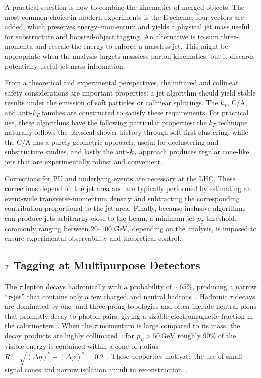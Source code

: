 A practical question is how to combine the kinematics of merged objects. The most common choice in modern experiments is the E-scheme: four-vectors are added, which preserves energy–momentum and yields a physical jet mass useful for substructure and boosted-object tagging. An alternative is to sum three-momenta and rescale the energy to enforce a massless jet. This might be appropriate when the analysis targets massless parton kinematics, but it discards potentially useful jet-mass information.

From a theoretical and experimental perspectives, the infrared and collinear safety considerations are important properties: a jet algorithm should yield stable results under the emission of soft particles or collinear splittings. The $k_T$, C/A, and anti-$k_T$ families are constructed to satisfy these requirements. For practical use, these algorithms have the following particular properties: the $k_T$ technique naturally follows the physical shower history through soft-first clustering, while the C/A has a purely geometric approach, useful for declustering and substructure studies, and lastly the anti-$k_T$ approach produces regular cone-like jets that are experimentally robust and convenient.

Corrections for PU and underlying events are necessary at the LHC. These corrections depend on the jet area and are typically performed by estimating an event-wide transverse-momentum density and subtracting the corresponding contribution proportional to the jet area. Finally, because inclusive algorithms can produce jets arbitrarily close to the beam, a minimum jet $p_T$ threshold, commonly ranging between 20–100 GeV, depending on the analysis, is imposed to ensure experimental observability and theoretical control.

\subsection{$\tau$ Tagging at Multipurpose Detectors}
\label{sec:tautagging}
The $\tau$ lepton decays hadronically with a probability of $\sim65\%$, producing a narrow ``$\tau$-jet'' that contains only a few charged and neutral hadrons~\cite{1674-1137-40-10-100001,CMS:2018jrd}. Hadronic $\tau$ decays are dominated by one- and three-prong topologies and often include neutral pions that promptly decay to photon pairs, giving a sizable electromagnetic fraction in the calorimeters~\cite{1674-1137-40-10-100001,ATLAS:2014rzk}. When the $\tau$ momentum is large compared to its mass, the decay products are highly collimated~\cite{CMS:2018jrd,CMS_DeepTau}: for $p_T>50\ \mathrm{GeV}$ roughly $90\%$ of the visible energy is contained within a cone of radius $R=\sqrt{(\Delta\eta)^2+(\Delta\varphi)^2}=0.2$~\cite{CMS:2018jrd}. These properties motivate the use of small signal cones and narrow isolation annuli in reconstruction~\cite{CMS:2018jrd,CMS_DeepTau}.

